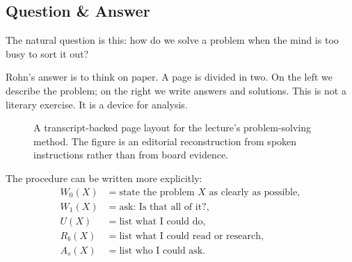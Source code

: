 \subsection{Question \& Answer}

The natural question is this: how do we solve a problem when the mind is too busy to sort it out?

Rohn's answer is to think on paper. A page is divided in two. On the left we describe the problem; on the right we write answers and solutions. This is not a literary exercise. It is a device for analysis.

\begin{figure}[t]
\centering
{}
\caption{A transcript-backed page layout for the lecture's problem-solving method. The figure is an editorial reconstruction from spoken instructions rather than from board evidence.}
\end{figure}

The procedure can be written more explicitly:
\begin{align}
W_0(X) &= \text{state the problem } X \text{ as clearly as possible}, \\
W_1(X) &= \text{ask: Is that all of it?}, \\
U(X) &= \text{list what I could do}, \\
R_b(X) &= \text{list what I could read or research}, \\
A_s(X) &= \text{list who I could ask}.
\end{align}

